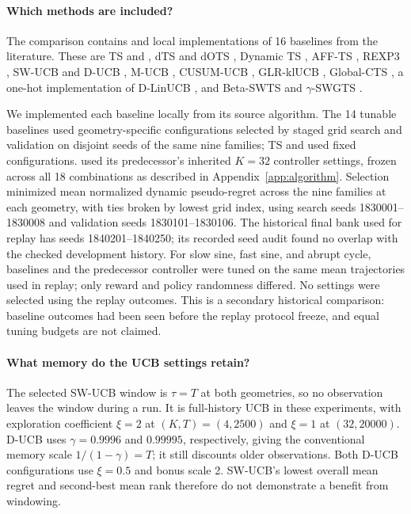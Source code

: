 \paragraph{Which methods are included?}
The comparison contains \method{} and local implementations of 16 baselines
from the literature. These are TS and \anchor{} \citep{thompson1933,may2012optimistic},
dTS and dOTS \citep{raj2017taming}, Dynamic TS \citep{gupta2011dynamic}, AFF-TS
\citep{lu2017adaptive}, REXP3 \citep{besbes2014rexp3}, SW-UCB and D-UCB
\citep{garivier2008ucb}, M-UCB \citep{cao2018mucb}, CUSUM-UCB
\citep{liu2017cusum}, GLR-klUCB \citep{besson2022glr}, Global-CTS
\citep{mellor2013globalcts}, a one-hot implementation of D-LinUCB
\citep{russac2019weighted}, and Beta-SWTS and $\gamma$-SWGTS
\citep{fiandri2024swts}.

We implemented each baseline locally from its source algorithm.
The 14 tunable baselines used geometry-specific configurations selected by
staged grid search and validation on disjoint seeds of the same nine families;
TS and \anchor{} used fixed configurations. \method{} used its predecessor's
inherited $K=32$ controller settings, frozen across all 18 combinations as
described in Appendix~\ref{app:algorithm}.
Selection minimized mean normalized dynamic pseudo-regret across the nine
families at each geometry, with ties broken by lowest grid index, using search seeds 1830001--1830008 and validation
seeds 1830101--1830106. The historical final bank used for replay has seeds
1840201--1840250; its recorded seed audit found no overlap with the checked
development history. For slow sine, fast sine, and abrupt cycle, baselines and
the predecessor controller were tuned on the same mean trajectories used in
replay; only reward and policy randomness differed.
No settings were selected using the replay outcomes. This is a secondary
historical comparison: baseline outcomes had been seen before the replay
protocol freeze, and equal tuning budgets are not claimed.

\paragraph{What memory do the UCB settings retain?}
The selected SW-UCB window is $\tau=T$ at both geometries, so no observation
leaves the window during a run. It is full-history UCB in these experiments,
with exploration coefficient $\xi=2$ at $(K,T)=(4,2500)$ and $\xi=1$ at
$(32,20000)$. D-UCB uses $\gamma=0.9996$ and $0.99995$, respectively, giving
the conventional memory scale $1/(1-\gamma)=T$; it still discounts older
observations. Both D-UCB configurations use $\xi=0.5$ and bonus scale 2.
SW-UCB's lowest overall mean regret and second-best mean rank therefore
do not demonstrate a benefit from windowing.

